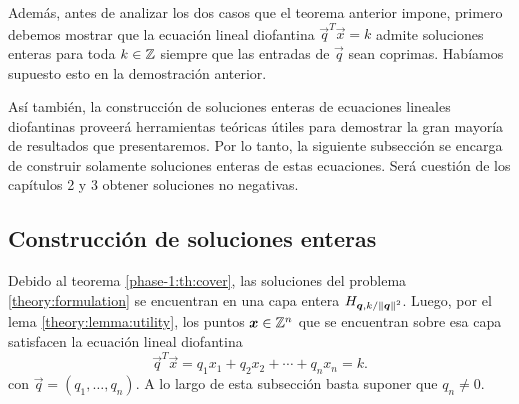 Además, antes de analizar los dos casos que el teorema anterior impone, primero debemos mostrar que la
ecuación lineal diofantina $\vec{q}^T\vec{x} = k$ admite soluciones enteras para toda $k \in \mathbb{Z}$
siempre que las entradas de $\vec{q}$ sean coprimas. Habíamos supuesto esto en la demostración
anterior.

Así también, la construcción de soluciones enteras de ecuaciones lineales diofantinas proveerá
herramientas teóricas útiles para demostrar la gran mayoría de resultados que presentaremos. Por lo
tanto, la siguiente subsección se encarga de construir solamente soluciones enteras de estas
ecuaciones. Será cuestión de los capítulos 2 y 3 obtener soluciones no negativas.

\subsection{Construcción de soluciones enteras}
\label{subsec:dioph-eq}
\noindent
Debido al teorema \ref{phase-1:th:cover}, las soluciones del problema \eqref{theory:formulation} se
encuentran en una capa entera $H_{\boldsymbol{q}, k/\left\lVert \boldsymbol{q} \right\rVert^{2}}$. Luego, por el lema \ref{theory:lemma:utility}, los
puntos $\boldsymbol{x} \in \mathbb{Z}^n$ que se encuentran sobre esa capa satisfacen la ecuación lineal diofantina
\begin{equation}
	\label{eq:dioph}
	\vec{q}^T\vec{x} = q_1x_1 + q_2x_2 + \cdots + q_nx_n = k.
\end{equation}
con $\vec{q} = (q_1, \ldots, q_n)$. A lo largo de esta subsección basta suponer que $q_n \neq 0$.

